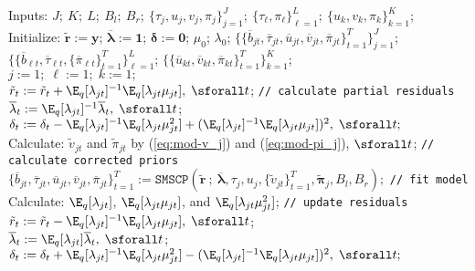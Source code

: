 \begin{algorithm}
\label{alg:2}
\small
\SetAlgoLined
  Inputs: $J;\:K;\:L;\:B_l;\:B_r;\:\{\tau_j,u_j,v_j,\pi_j\}_{j=1}^J;\:\{\tau_\ell,\pi_\ell\}_{\ell=1}^L;\:\{u_k,v_k,\pi_k\}_{k=1}^K$; \\
  Initialize: $\tilde{\mathbf{r}} := \mathbf{y}$; $\overline{\pmb{\lambda}}:= \mathbf{1}$; $\pmb{\delta}:=\mathbf{0}$; $\mu_0$; $\lambda_0$; $\{\{\overline{b}_{jt}, \overline{\tau}_{jt}, \overline{u}_{jt}, \overline{v}_{jt}, \overline{\pi}_{jt}\}_{t=1}^T\}_{j=1}^J$; $\{\{\overline{b}_{\ell t}, \overline{\tau}_{\ell t}, \{\overline{\pi}_{\ell t}\}_{t=1}^T\}_{\ell=1}^L$; $\{\{\overline{u}_{kt}, \overline{v}_{kt}, \overline{\pi}_{kt}\}_{t=1}^T\}_{k=1}^K$;\\
  
   {
    $j:=1;\;\ell:=1;\;k:=1;$ \\
     {
      $\tilde{r}_t := \tilde{r}_t + \E_q[\lambda_{jt}]^{-1}\E_q[\lambda_{jt} \mu_{jt}],\; \sforall t$; \texttt{// calculate partial residuals} \\
      $\overline{\lambda}_t := \E_q[\lambda_{jt}]^{-1}\overline{\lambda}_t, \; \sforall t$; \\
      $\delta_t := \delta_t - \E_q[\lambda_{jt}]^{-1}\E_q[\lambda_{jt} \mu^2_{jt}] + (\E_q[\lambda_{jt}]^{-1}\E_q[\lambda_{jt} \mu_{jt}])^2,\; \sforall t;$ \\
      Calculate: $\tilde{v}_{jt}$ and $\tilde{\pi}_{jt}$ by (\ref{eq:mod-v_j}) and (\ref{eq:mod-pi_j}), $\sforall t$; \texttt{// calculate corrected priors} \\
      $\{\overline{b}_{jt}, \overline{\tau}_{jt}, \overline{u}_{jt}, \overline{v}_{jt}, \overline{\pi}_{jt}\}_{t=1}^T := \texttt{SMSCP}\left(\tilde{\mathbf{r}} \:;\:\overline{\pmb{\lambda}}, \tau_j, u_j, \{\tilde{v}_{jt}\}_{t=1}^T, \tilde{\pmb{\pi}}_j, B_l,B_r\right);$ \texttt{// fit model}\\
      Calculate: $\E_q[\lambda_{jt}]$, $\E_q[\lambda_{jt} \mu_{jt}]$, and $\E_q[\lambda_{jt} \mu^2_{jt}]$; \texttt{// update residuals}\\
      $\tilde{r}_t := \tilde{r}_t - \E_q[\lambda_{jt}]^{-1}\E_q[\lambda_{jt} \mu_{jt}],\; \sforall t$; \\
      $\overline{\lambda}_t := \E_q[\lambda_{jt}]\overline{\lambda}_t, \; \sforall t$; \\
      $\delta_t := \delta_t + \E_q[\lambda_{jt}]^{-1}\E_q[\lambda_{jt} \mu^2_{jt}] - (\E_q[\lambda_{jt}]^{-1}\E_q[\lambda_{jt} \mu_{jt}])^2,\; \sforall t;$ \\
}}
\end{algorithm}
